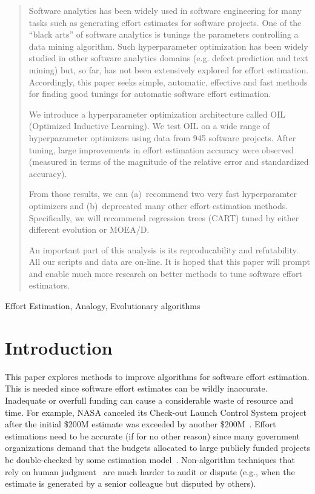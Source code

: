\documentclass[10pt,conference]{IEEEtran}
\begin{document}
\begin{abstract}
Software analytics has  been widely used in software engineering for many tasks such as 
generating effort estimates for  software projects.
One 
of the ``black arts'' of software analytics is  tunings the  parameters
controlling a  data mining algorithm.
Such hyperparameter optimization has been widely studied in other software analytics domains
(e.g. defect prediction and text mining) but, so far, has not been extensively explored for effort
estimation.
Accordingly, this paper seeks simple, automatic,     effective and fast methods
for finding good  tunings for  automatic software effort estimation.

We introduce a   hyperparameter optimization architecture called
  OIL  (Optimized Inductive Learning). 
  We test OIL  on a wide range of hyperparameter optimizers using  
  data from 945 software projects. After tuning,
  large improvements in effort estimation accuracy were observed
  (measured in terms of the magnitude of the relative error and standardized accuracy).
  
  From those results, we can (a)~recommend
  two
  very fast hyperparamter optimizers 
  and (b)~deprecated many other effort estimation methods.
  Specifically, we will recommend regression trees (CART) tuned by either different evolution or  MOEA/D.
 
   
An important part of this analysis is its reproducability and refutability. All our scripts
and data are on-line. It is hoped that this paper will prompt and enable much more research on better methods
to tune software effort estimators.
\end{abstract}
\begin{IEEEkeywords}
Effort Estimation, Analogy, Evolutionary algorithms
\end{IEEEkeywords}
 


\section{Introduction}\label{sect:intro}

This paper explores methods to improve algorithms
for software effort estimation.
This is needed since software  effort estimates   can be 
wildly inaccurate\cite{kemerer1987empirical}. Inadequate or overfull funding can cause a considerable waste of resource and time. For example, NASA canceled its  Check-out Launch Control System project after the initial \$200M estimate was exceeded by another \$200M~\cite{cowing02}. Effort estimations need to be accurate  (if for
no other reason) since many government
organizations demand that the budgets allocated to
large publicly funded projects be double-checked by some estimation model~\cite{MenziesNeg:2017}.  
Non-algorithm techniques that rely on human judgment~\cite{jorgensen2004review} are much harder to  
audit or 
dispute (e.g.,  when the estimate is generated by a senior colleague but disputed by others). 
\end{document}
